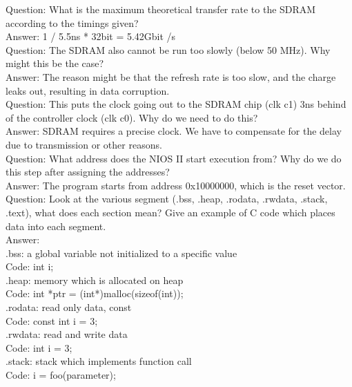 \documentclass[12pt]{article}
\begin{document}
Question: What is the maximum theoretical transfer rate to the SDRAM according to the timings given? \\

Answer: 1 / 5.5ns * 32bit = 5.42Gbit /s \\

Question: The SDRAM also cannot be run too slowly (below 50 MHz). Why might this be the case? \\

Answer: The reason might be that the refresh rate is too slow, and the charge leaks out, resulting in data corruption. \\

Question: This puts the clock going out to the SDRAM chip (clk c1) 3ns behind of the controller clock (clk c0). Why do we need to do this? \\

Answer: SDRAM requires a precise clock. We have to compensate for the delay due to transmission or other reasons. \\

Question: What address does the NIOS II start execution from? Why do we do this step after assigning the addresses? \\

Answer: The program starts from address 0x10000000, which is the reset vector. \\

Question: Look at the various segment (.bss, .heap, .rodata, .rwdata, .stack, .text), what does each section mean? Give an example of C code which places data into each segment. \\


Answer: \\
.bss:		a global variable not initialized to a specific value \\
Code:		int i; \\

.heap:		memory which is allocated on heap \\
Code:		int *ptr = (int*)malloc(sizeof(int)); \\

.rodata: 	read only data, const \\
Code:		const int i = 3; \\

.rwdata:	read and write data \\
Code:		int i = 3; \\


.stack:		stack which implements function call \\
Code:		i = foo(parameter); \\
\end{document}
